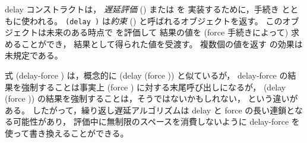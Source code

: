 \begin{entry}{%
}


\semantics
{\cf delay} コンストラクトは，
{\em 遅延評価} () または  を
実装するために，手続き  とともに使われる。
{\tt(delay~)} は{\em 約束} () と呼ばれるオブジェクトを返す。
このオブジェクトは未来のある時点で  を評価して
結果の値を ({\cf force} 手続きによって) 求めることができ，
結果として得られた値を受渡す。
複数個の値を返す  の効果は未規定である。

\end{entry}

\begin{entry}{%
}


\semantics
式 {\cf (delay-force )} は，概念的に {\cf (delay (force ))} と似ているが，
{\cf delay-force} の結果を強制することは事実上 {\cf (force )} に対する末尾呼び出しになるが，
{\cf (delay (force ))} の結果を強制することは，そうではないかもしれない，
という違いがある。
したがって，繰り返し遅延アルゴリズムは
{\cf delay} と {\cf force} の長い連鎖となる可能性があり，
評価中に無制限のスペースを消費しないように {\cf delay-force} を使って書き換えることができる。

\end{entry}

